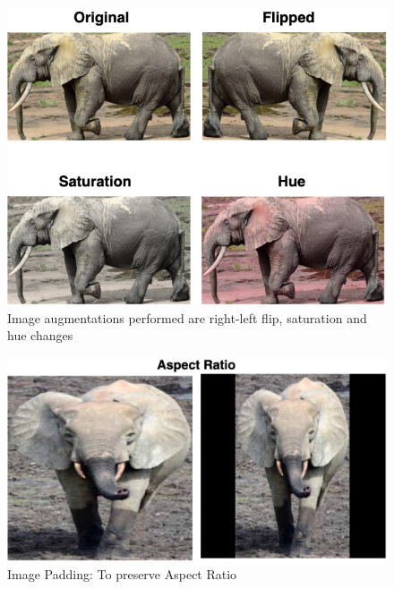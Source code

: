 \documentclass[10pt,twocolumn,letterpaper]{article}
\begin{document}
\begin{figure}[t]
  \centering
  \includegraphics[scale=0.37]{augmentation}
   \caption{Image augmentations performed are right-left flip, saturation and hue changes}
   \label{fig:augmentation}
\end{figure}

\begin{figure}[t]
  \centering
  \includegraphics[scale=0.23]{image_padding}
   \caption{Image Padding: To preserve Aspect Ratio}
   \label{fig:image_padding}
\end{figure}
\end{document}
